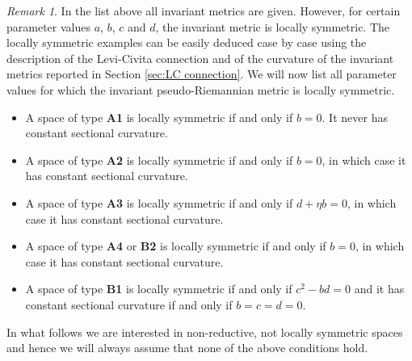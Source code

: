 \documentclass{amsart}
\theoremstyle{plain}
\theoremstyle{remark}
\newtheorem{remark}{Remark}
\begin{document}
\begin{remark}\label{rem:symmetric cases}
In the list above all invariant metrics are given. However, for certain parameter values $a$, $b$, $c$ and $d$, the invariant metric is locally symmetric. The locally symmetric examples can be easily deduced case by case using the description of the Levi-Civita connection and of the curvature of the invariant metrics reported in Section \ref{sec:LC connection}. We will now list all parameter values for which the invariant pseudo-Riemannian metric is locally symmetric.
\begin{itemize}
\item A space of type \textbf{A1} is locally symmetric if and only if $b=0$. It never has constant sectional curvature.
\item A space of type \textbf{A2} is locally symmetric if and only if $b=0$, in which case it has constant sectional curvature.
\item A space of type \textbf{A3} is locally symmetric if and only if $d+\eta b=0$, in which case it has constant sectional curvature.
\item A space of type \textbf{A4} or \textbf{B2} is locally symmetric if and only if $b=0$, in which case it has constant sectional curvature.
\item A space of type \textbf{B1} is locally symmetric if and only if $c^2-bd=0$ and it has constant sectional curvature if and only if $b=c=d=0$.
\end{itemize}
In what follows we are interested in non-reductive, not locally symmetric spaces and hence we will always assume that none of the above conditions hold.
\end{remark}
\end{document}
